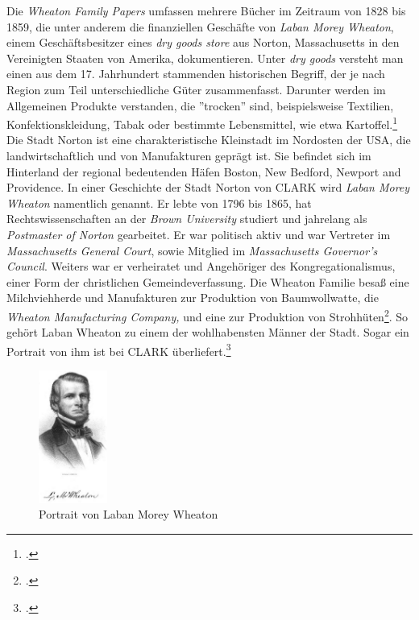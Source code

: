 \documentclass[12pt,a4paper]{article}
\begin{document}
Die \textit{Wheaton Family Papers} umfassen mehrere Bücher im Zeitraum von 1828 bis 1859, die unter anderem die finanziellen Geschäfte von \textit{Laban Morey Wheaton}, einem Geschäftsbesitzer eines \textit{dry goods store} aus Norton, Massachusetts in den Vereinigten Staaten von Amerika, dokumentieren. Unter \textit{dry goods} versteht man einen aus dem 17. Jahrhundert stammenden historischen Begriff, der je nach Region zum Teil unterschiedliche Güter zusammenfasst. Darunter werden im Allgemeinen Produkte verstanden, die ''trocken'' sind, beispielsweise Textilien, Konfektionskleidung, Tabak oder bestimmte Lebensmittel, wie etwa Kartoffel.\footcite[Definition von \textit{Dry Goods}, \protect\url{https://chestofbooks.com/reference/Dictionary-of-Dry-Goods/Dry-Goods.html}, 23.05.2019, Vgl.][]{cole2015complete}
\\
Die Stadt Norton ist eine charakteristische Kleinstadt im Nordosten der USA, die landwirtschaftlich und von Manufakturen geprägt ist. Sie befindet sich im Hinterland der regional bedeutenden Häfen Boston, New Bedford, Newport and Providence. In einer Geschichte der Stadt Norton von CLARK wird \textit{Laban Morey Wheaton} namentlich genannt. Er lebte von 1796 bis 1865, hat Rechtswissenschaften an der \textit{Brown University} studiert und jahrelang als \textit{Postmaster of Norton} gearbeitet. Er war politisch aktiv und war Vertreter im \textit{Massachusetts General Court}, sowie Mitglied im \textit{Massachusetts Governor's Council}. Weiters war er verheiratet und Angehöriger des Kongregationalismus, einer Form der christlichen Gemeindeverfassung. Die Wheaton Familie besaß eine Milchviehherde und Manufakturen zur Produktion von Baumwollwatte, die \textit{Wheaton Manufacturing Company,} und eine zur Produktion von Strohhüten\footcite[][S.6]{tomasek2013encoding}. So gehört Laban Wheaton zu einem der wohlhabensten Männer der Stadt. Sogar ein Portrait von ihm ist bei CLARK überliefert.\footcite[][S.496]{clark1859history} 
\begin{figure}[H]
\centering
	\includegraphics[width=0.2\textwidth]{img/LMwheaton.jpg}  
    \caption[Portrait von Laban Morey Wheaton, Vgl. CLARK, George Faber: A History of the Town of Norton, Bristol County, Massachusetts, from 1669-1859.
Crosby, Nichols, and Company, and author at Norton, 1859, S.497.]{Portrait von Laban Morey Wheaton} \label{fig:LMwheaton}
\end{figure} 
\end{document}
